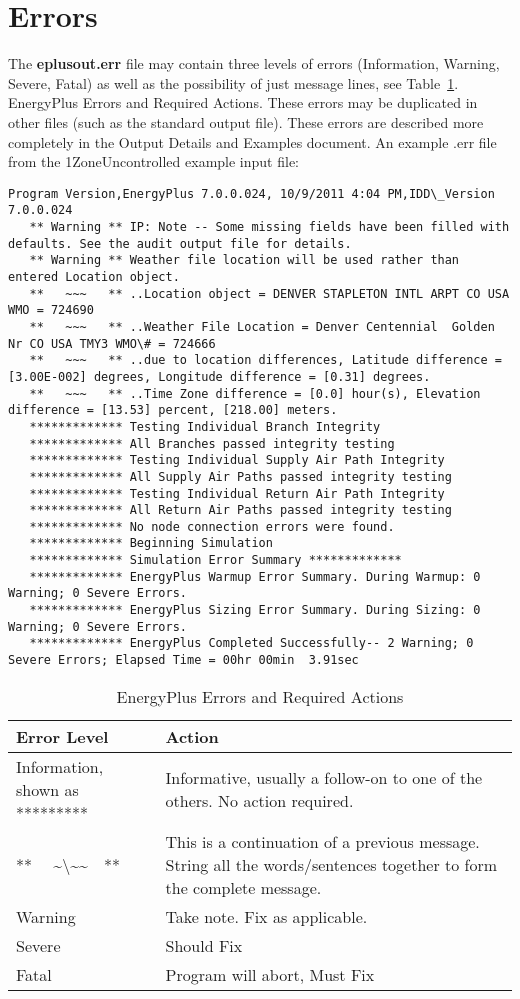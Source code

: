 \section{Errors}\label{errors}

The \textbf{eplusout.err} file may contain three levels of errors (Information, Warning, Severe, Fatal) as well as the possibility of just message lines, see Table~\ref{table:energyplus-errors-and-required-actions}. EnergyPlus Errors and Required Actions. These errors may be duplicated in other files (such as the standard output file). These errors are described more completely in the Output Details and Examples document. An example .err file from the 1ZoneUncontrolled example input file:

\begin{lstlisting}
Program Version,EnergyPlus 7.0.0.024, 10/9/2011 4:04 PM,IDD\_Version 7.0.0.024
   ** Warning ** IP: Note -- Some missing fields have been filled with defaults. See the audit output file for details.
   ** Warning ** Weather file location will be used rather than entered Location object.
   **   ~~~   ** ..Location object = DENVER STAPLETON INTL ARPT CO USA WMO = 724690
   **   ~~~   ** ..Weather File Location = Denver Centennial  Golden   Nr CO USA TMY3 WMO\# = 724666
   **   ~~~   ** ..due to location differences, Latitude difference = [3.00E-002] degrees, Longitude difference = [0.31] degrees.
   **   ~~~   ** ..Time Zone difference = [0.0] hour(s), Elevation difference = [13.53] percent, [218.00] meters.
   ************* Testing Individual Branch Integrity
   ************* All Branches passed integrity testing
   ************* Testing Individual Supply Air Path Integrity
   ************* All Supply Air Paths passed integrity testing
   ************* Testing Individual Return Air Path Integrity
   ************* All Return Air Paths passed integrity testing
   ************* No node connection errors were found.
   ************* Beginning Simulation
   ************* Simulation Error Summary *************
   ************* EnergyPlus Warmup Error Summary. During Warmup: 0 Warning; 0 Severe Errors.
   ************* EnergyPlus Sizing Error Summary. During Sizing: 0 Warning; 0 Severe Errors.
   ************* EnergyPlus Completed Successfully-- 2 Warning; 0 Severe Errors; Elapsed Time = 00hr 00min  3.91sec
\end{lstlisting}

\begin{longtable}[c]{p{1.5in}p{4.5in}}
\caption{EnergyPlus Errors and Required Actions \protect \label{table:energyplus-errors-and-required-actions}}\\
\toprule 
Error Level & Action \tabularnewline \midrule
\endhead
Information, shown as ********* & Informative, usually a follow-on to one of the others. No action required. \tabularnewline
**~~ \~{}\textbackslash\~{}\~{}~~** & This is a continuation of a previous message.~ String all the words/sentences together to form the complete message. \tabularnewline
Warning & Take note. Fix as applicable. \tabularnewline
Severe & Should Fix \tabularnewline
Fatal & Program will abort, Must Fix \tabularnewline
\bottomrule
\end{longtable}

